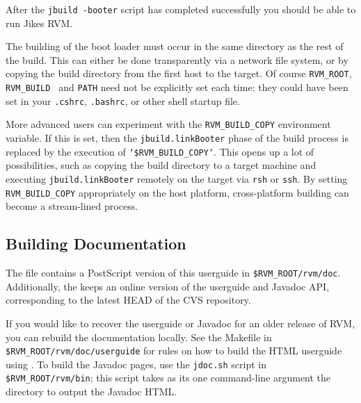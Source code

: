 After the {\tt jbuild -booter} script has completed successfully you should be able 
to run Jikes RVM. 

The building of the boot loader must occur in the same directory as
the rest of the build.  This can either be done transparently via a
network file system, or by copying the build directory from the first
host to the target.  Of course {\tt RVM\_ROOT}, {\tt RVM\_BUILD }
and {\tt PATH} need not be explicitly set each time: they could have
been set in your {\tt .cshrc}, {\tt .bashrc}, or other shell startup file.

More advanced users can experiment with the {\tt RVM\_BUILD\_COPY}
environment variable.  If this is set, then the 
{\tt jbuild.linkBooter} phase of the build process is replaced by the
execution of {\tt `\$RVM\_BUILD\_COPY`}.  This opens up a lot of
possibilities, such as copying the build directory to a target
machine and executing {\tt jbuild.linkBooter} remotely on the target
via {\tt rsh} or {\tt ssh}.  By setting {\tt RVM\_BUILD\_COPY}
appropriately on the host platform, cross-platform building can become
a stream-lined process.

\JikesAIXTMFooter

\JavaTMFooter

\subsection{Building Documentation}

The {\tt \RVMTarFile} file contains a PostScript version of this userguide
in {\tt \$RVM\_ROOT/rvm/doc}.  Additionally, the 
 keeps an online version of
the userguide and Javadoc API, corresponding to the latest HEAD of the CVS
repository.

If you would like to recover the userguide or Javadoc for an older release
of RVM, you can rebuild the documentation locally.  See the Makefile in
{\tt \$RVM\_ROOT/rvm/doc/userguide} for rules on how to build the
HTML userguide using
.  To build the Javadoc pages, use
the {\tt jdoc.sh} script in {\tt \$RVM\_ROOT/rvm/bin}; this script takes as
its one command-line argument the directory to output the Javadoc HTML.
